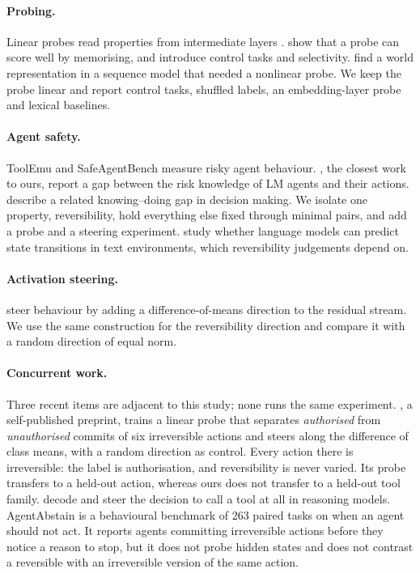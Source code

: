 \documentclass[11pt]{article}
\begin{document}
\paragraph{Probing.} Linear probes read properties from intermediate layers
\citep{alain2016probes}. \citet{hewitt2019control} show that a probe can score well by
memorising, and introduce control tasks and selectivity. \citet{li2023othello} find a world
representation in a sequence model that needed a nonlinear probe. We keep the probe linear and
report control tasks, shuffled labels, an embedding-layer probe and lexical baselines.

\paragraph{Agent safety.} ToolEmu \citep{ruan2024toolemu} and SafeAgentBench
\citep{yin2024safeagentbench} measure risky agent behaviour. \citet{tang2025riskknowledge}, the
closest work to ours, report a gap between the risk knowledge of LM agents and their actions.
\citet{schmied2026greedy} describe a related knowing--doing gap in decision making. We isolate
one property, reversibility, hold everything else fixed through minimal pairs, and add a probe
and a steering experiment. \citet{wang2024simulators} study whether language models can predict
state transitions in text environments, which reversibility judgements depend on.

\paragraph{Activation steering.} \citet{rimsky2024caa} steer behaviour by adding a
difference-of-means direction to the residual stream. We use the same construction for the
reversibility direction and compare it with a random direction of equal norm.

\paragraph{Concurrent work.} Three recent items are adjacent to this study; none runs the same
experiment. \citet{vicentino2026authorization}, a self-published preprint, trains a linear probe
that separates \emph{authorised} from \emph{unauthorised} commits of six irreversible actions
and steers along the difference of class means, with a random direction as control. Every action
there is irreversible: the label is authorisation, and reversibility is never varied. Its probe
transfers to a held-out action, whereas ours does not transfer to a held-out tool family.
\citet{esakkiraja2026therefore} decode and steer the decision to call a tool at all in reasoning
models. AgentAbstain \citep{liu2026agentabstain} is a behavioural benchmark of 263 paired tasks
on when an agent should not act. It reports agents committing irreversible actions before they
notice a reason to stop, but it does not probe hidden states and does not contrast a reversible
with an irreversible version of the same action.
\end{document}
